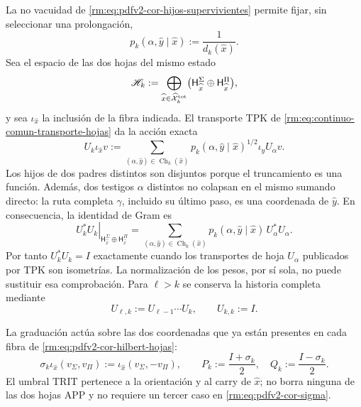 La no vacuidad de \eqref{rm:eq:pdfv2-cor-hijos-supervivientes} permite fijar,
sin seleccionar una prolongación,
\begin{equation}
\label{rm:eq:pdfv2-cor-peso-conteo}
 p_k(\alpha,\widehat y\mid\widehat x)
 :=\frac1{d_k(\widehat x)}.
\end{equation}
Sea el espacio de las dos hojas del mismo estado
\begin{equation}
\label{rm:eq:pdfv2-cor-hilbert-hojas}
 \mathscr H_k:=
 \bigoplus_{\widehat x\in\widehat{\mathcal X}^{\rm tot}_k}
 \bigl(\mathsf H_{\widehat x}^{\Sigma}
       \oplus\mathsf H_{\widehat x}^{\Pi}\bigr),
\end{equation}
y sea \(\iota_{\widehat x}\) la inclusión de la fibra indicada. El transporte
TPK de \eqref{rm:eq:continuo-comun-transporte-hojas} da la acción exacta
\begin{equation}
\label{rm:eq:pdfv2-cor-u-comun}
 U_k\iota_{\widehat x}v:=
 \sum_{(\alpha,\widehat y)\in\operatorname{Ch}_k(\widehat x)}
 p_k(\alpha,\widehat y\mid\widehat x)^{1/2}
 \iota_{\widehat y}U_\alpha v.
\end{equation}
Los hijos de dos padres distintos son disjuntos porque el truncamiento es una
función. Además, dos testigos \(\alpha\) distintos no colapsan en el mismo
sumando directo: la ruta completa \(\gamma\), incluido su último paso, es una
coordenada de \(\widehat y\). En consecuencia, la identidad de Gram es
\begin{equation}
\label{rm:eq:pdfv2-cor-u-gram}
 \left.U_k^*U_k\right|_{\mathsf H_{\widehat x}^{\Sigma}
       \oplus\mathsf H_{\widehat x}^{\Pi}}
 =
 \sum_{(\alpha,\widehat y)\in\operatorname{Ch}_k(\widehat x)}
 p_k(\alpha,\widehat y\mid\widehat x)\,U_\alpha^*U_\alpha.
\end{equation}
Por tanto \(U_k^*U_k=I\) exactamente cuando los transportes de hoja
\(U_\alpha\) publicados por TPK son isometrías. La normalización de los pesos,
por sí sola, no puede sustituir esa comprobación.
Para \(\ell>k\) se conserva la historia completa mediante
\begin{equation}
\label{rm:eq:pdfv2-cor-u-iterado}
 U_{\ell,k}:=U_{\ell-1}\cdots U_k,
 \qquad U_{k,k}:=I.
\end{equation}

La graduación actúa sobre las dos coordenadas que ya están presentes en cada
fibra de \eqref{rm:eq:pdfv2-cor-hilbert-hojas}:
\begin{equation}
\label{rm:eq:pdfv2-cor-sigma}
 \sigma_k\iota_{\widehat x}(v_\Sigma,v_\Pi)
 :=\iota_{\widehat x}(v_\Sigma,-v_\Pi),
\qquad
 P_k:=\frac{I+\sigma_k}{2},\quad
 Q_k:=\frac{I-\sigma_k}{2}.
\end{equation}
El umbral TRIT pertenece a la orientación y al carry de
\(\widehat x\); no borra ninguna de las dos hojas APP y no requiere un tercer
caso en \eqref{rm:eq:pdfv2-cor-sigma}.

